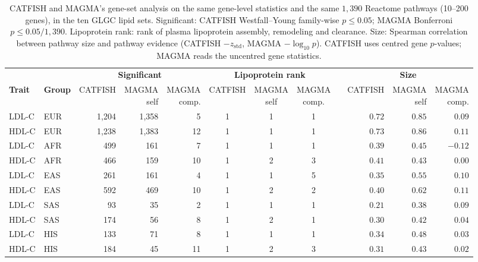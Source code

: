 \begin{table}[!htbp]
\centering
\caption{CATFISH and MAGMA's gene-set analysis on the same gene-level statistics and the same $1{,}390$ Reactome pathways (10--200 genes), in the ten GLGC lipid sets. Significant: CATFISH Westfall--Young family-wise $p\le0.05$; MAGMA Bonferroni $p\le0.05/1{,}390$. Lipoprotein rank: rank of plasma lipoprotein assembly, remodeling and clearance. Size: Spearman correlation between pathway size and pathway evidence (CATFISH $-z_{\mathrm{std}}$, MAGMA $-\log_{10}p$). CATFISH uses centred gene $p$-values; MAGMA reads the uncentred gene statistics.}
\label{tab:magma_compare}
\small
\begin{tabular*}{\linewidth}{@{\extracolsep{\fill}}llrrrccccrrr}
\hline
 & & \multicolumn{3}{c}{\textbf{Significant}} & \multicolumn{3}{c}{\textbf{Lipoprotein rank}} & & \multicolumn{3}{c}{\textbf{Size}} \\
\textbf{Trait} & \textbf{Group} & CATFISH & \makecell[r]{MAGMA\\self} & \makecell[r]{MAGMA\\comp.} & CATFISH & \makecell[c]{MAGMA\\self} & \makecell[c]{MAGMA\\comp.} & & CATFISH & \makecell[r]{MAGMA\\self} & \makecell[r]{MAGMA\\comp.} \\
\hline
LDL-C & EUR & 1{,}204 & 1{,}358 & 5 & 1 & 1 & 1 & & $0.72$ & $0.85$ & $0.09$ \\
HDL-C & EUR & 1{,}238 & 1{,}383 & 12 & 1 & 1 & 1 & & $0.73$ & $0.86$ & $0.11$ \\
LDL-C & AFR & 499 & 161 & 7 & 1 & 1 & 1 & & $0.39$ & $0.45$ & $-0.12$ \\
HDL-C & AFR & 466 & 159 & 10 & 1 & 2 & 3 & & $0.41$ & $0.43$ & $0.00$ \\
LDL-C & EAS & 261 & 161 & 4 & 1 & 1 & 5 & & $0.35$ & $0.55$ & $0.10$ \\
HDL-C & EAS & 592 & 469 & 10 & 1 & 2 & 2 & & $0.40$ & $0.62$ & $0.11$ \\
LDL-C & SAS & 93 & 35 & 2 & 1 & 1 & 1 & & $0.21$ & $0.38$ & $0.09$ \\
HDL-C & SAS & 174 & 56 & 8 & 1 & 2 & 1 & & $0.30$ & $0.42$ & $0.04$ \\
LDL-C & HIS & 133 & 71 & 8 & 1 & 1 & 1 & & $0.34$ & $0.48$ & $0.03$ \\
HDL-C & HIS & 184 & 45 & 11 & 1 & 2 & 3 & & $0.31$ & $0.43$ & $0.02$ \\
\hline
\end{tabular*}
\end{table}

